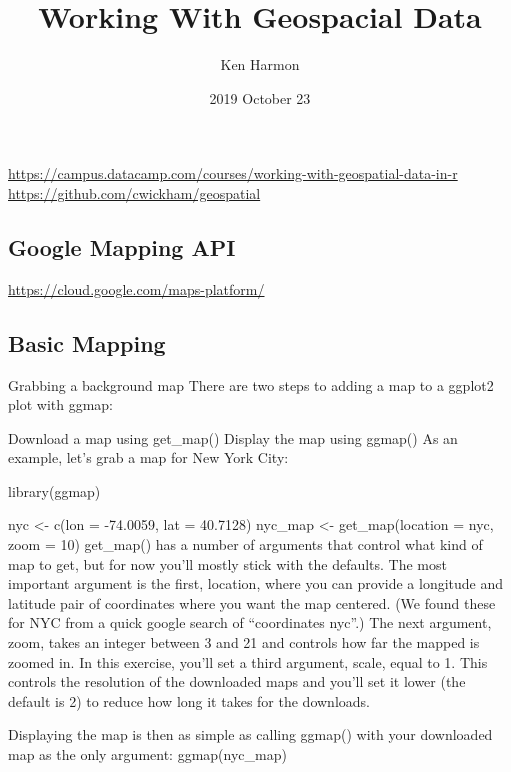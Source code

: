\documentclass[]{article}
\title{Working With Geospacial Data}
\author{Ken Harmon}
\date{2019 October 23}
\begin{document}
\maketitle

\hypertarget{section}{%
\section{}\label{section}}

\url{https://campus.datacamp.com/courses/working-with-geospatial-data-in-r}
\url{https://github.com/cwickham/geospatial}

\hypertarget{google-mapping-api}{%
\subsection{Google Mapping API}\label{google-mapping-api}}

\url{https://cloud.google.com/maps-platform/}

\hypertarget{basic-mapping}{%
\subsection{Basic Mapping}\label{basic-mapping}}

Grabbing a background map There are two steps to adding a map to a
ggplot2 plot with ggmap:

Download a map using get\_map() Display the map using ggmap() As an
example, let's grab a map for New York City:

library(ggmap)

nyc \textless- c(lon = -74.0059, lat = 40.7128) nyc\_map \textless-
get\_map(location = nyc, zoom = 10) get\_map() has a number of arguments
that control what kind of map to get, but for now you'll mostly stick
with the defaults. The most important argument is the first, location,
where you can provide a longitude and latitude pair of coordinates where
you want the map centered. (We found these for NYC from a quick google
search of ``coordinates nyc''.) The next argument, zoom, takes an
integer between 3 and 21 and controls how far the mapped is zoomed in.
In this exercise, you'll set a third argument, scale, equal to 1. This
controls the resolution of the downloaded maps and you'll set it lower
(the default is 2) to reduce how long it takes for the downloads.

Displaying the map is then as simple as calling ggmap() with your
downloaded map as the only argument: ggmap(nyc\_map)
\end{document}
